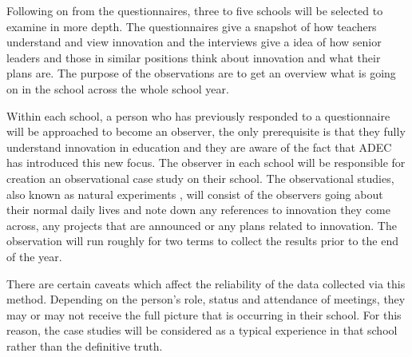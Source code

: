 Following on from the questionnaires, three to five schools will be selected to examine in more depth. The questionnaires give a snapshot of how teachers understand and view innovation and the interviews give a idea of how senior leaders and those in similar positions think about innovation and what their plans are. The purpose of the observations are to get an overview what is going on in the school across the whole school year. 

Within each school, a person who has previously responded to a questionnaire will be approached to become an observer, the only prerequisite is that they fully understand innovation in education and they are aware of the fact that ADEC has introduced this new focus. The observer in each school will be responsible for creation an observational case study on their school. The observational studies, also known as natural experiments \cite[p. 2]{0a338f}, will consist of the observers going about their normal daily lives and note down any references to innovation they come across, any projects that are announced or any plans related to innovation. The observation will run roughly for two terms to collect the results prior to the end of the year.

There are certain caveats which affect the reliability of the data collected via this method. Depending on the person's role, status and attendance of meetings, they may or may not receive the full picture that is occurring in their school. For this reason, the case studies will be considered as a typical experience in that school rather than the definitive truth.

